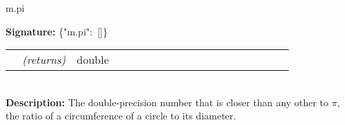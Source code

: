 {{    {m.pi}{\hypertarget{m.pi}{\noindent \mbox{\hspace{0.015\linewidth}} {\bf Signature:} \mbox{\PFAc \{"m.pi":$\!$ []\} \vspace{0.2 cm} \\} \vspace{0.2 cm} \\ \rm \begin{tabular}{p{0.01\linewidth} l p{0.8\linewidth}} & {\it (returns)} & double \\ \end{tabular} \vspace{0.3 cm} \\ \mbox{\hspace{0.015\linewidth}} {\bf Description:} The double-precision number that is closer than any other to $\pi$, the ratio of a circumference of a circle to its diameter. \vspace{0.2 cm} \\ }}%
}}
